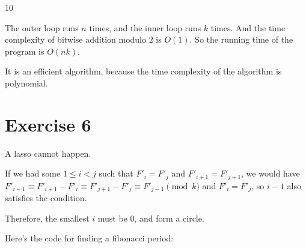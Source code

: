 \documentclass[
]{article}
\newenvironment{Shaded}{\begin{snugshade}}{\end{snugshade}}
\newcommand{\BuiltInTok}[1]{#1}
\newcommand{\ControlFlowTok}[1]{\textcolor[rgb]{0.13,0.29,0.53}{\textbf{#1}}}
\newcommand{\DecValTok}[1]{\textcolor[rgb]{0.00,0.00,0.81}{#1}}
\newcommand{\KeywordTok}[1]{\textcolor[rgb]{0.13,0.29,0.53}{\textbf{#1}}}
\newcommand{\NormalTok}[1]{#1}
\newcommand{\OperatorTok}[1]{\textcolor[rgb]{0.81,0.36,0.00}{\textbf{#1}}}
\newcommand{\SpecialCharTok}[1]{\textcolor[rgb]{0.00,0.00,0.00}{#1}}
\newcommand{\SpecialStringTok}[1]{\textcolor[rgb]{0.31,0.60,0.02}{#1}}
\newcommand{\VariableTok}[1]{\textcolor[rgb]{0.00,0.00,0.00}{#1}}
\begin{document}
\begin{Shaded}
\begin{Highlighting}[]
\NormalTok{10}
\end{Highlighting}
\end{Shaded}

The outer loop runs \(n\) times, and the inner loop runs \(k\) times.
And the time complexity of bitwise addition modulo \(2\) is \(O(1)\). So
the running time of the program is \(O(nk)\).

It is an efficient algorithm, because the time complexity of the
algorithm is polynomial.

\hypertarget{exercise-6}{%
\section{Exercise 6}\label{exercise-6}}

A lasso cannot happen.

If we had some \(1\le i<j\) such that \(F'_i=F'_j\) and
\(F'_{i+1}=F'_{j+1}\), we would have
\(F'_{i-1}\equiv F'_{i+1}-F'_i\equiv F'_{j+1}-F'_j\equiv F'_{j-1}\pmod k\)
and \(F'_i=F'_j\), so \(i-1\) also satisfies the condition.

Therefore, the smallest \(i\) must be \(0\), and form a circle.

Here's the code for finding a fibonacci period:

\begin{Shaded}
\end{Shaded}
\end{document}
